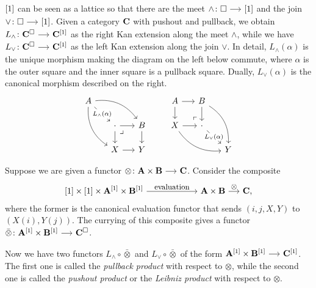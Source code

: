 \documentclass[a4paper,  dvipsnames, 11pt]{amsart}
\begin{document}
\begin{definition}
	\label{defn:LmeetLjoin}
	${\left[1\right]}$ can be seen as a lattice so that there are
	the meet $\land\colon\Box\arr\ra$ and the join $\lor\colon\Box\arr\ra$.
	Given a category $\mathbf{C}$ with pushout and pullback,
	we obtain $L_\land\colon\one{C}^\Box\arr\one{C}^\ra$ as the right Kan extension along the meet $\land$,
	while we have $L_\lor\colon\one{C}^\Box\arr\one{C}^\ra$ as the left Kan extension along the join $\lor$.
	In detail, $L_{\land}(\alpha)$ is the unique morphism making the diagram on the left below commute,
	where $\alpha$ is the outer square and the inner square is a pullback square.
	Dually, $L_{\lor}(\alpha)$ is the canonical morphism described on the right.
	\[
		\begin{tikzcd}[column sep=5mm, row sep=5mm]
			A
			\ar[rdd,bend right]
			\ar[rrd,bend left]
			\ar[rd,"L_\land(\alpha)"description]
				&
					&
			\\
				&
				\cdot
				\ar[r]
				\ar[d]
				\pullback[rd]
					&
					B
					\ar[d]
			\\
				&
				X
				\ar[r]
					&
					Y
		\end{tikzcd}
		\hspace{5ex}
		\begin{tikzcd}[column sep=5mm, row sep=5mm]
			A
			\ar[r]
			\ar[d]
				&
				B
				\ar[d]
				\ar[rdd,bend left]
					&
			\\
			X
			\ar[r]
			\ar[rrd,bend right]
				&
				\cdot
				\ar[rd,"L_\lor(\alpha)"{description,inner sep=.1em}]
				\pullbackR[lu]
					&
			\\
				&
					&
					Y
		\end{tikzcd}
	\]
\end{definition}
\begin{definition}
	Suppose we are given a functor $\otimes\colon\one{A}\times\one{B}\arr\one{C}$.
	Consider the composite
	\[
		\ra\times\ra\times\one{A}^\ra\times\one{B}^\ra
		\arr"\text{evaluation}"[][6]
		\one{A}\times\one{B}
		\arr"\otimes"
		\one{C}\text{,}
	\]
	where the former is the canonical evaluation functor that sends $(i,j,X,Y)$ to $(X(i),Y(j))$.
	The currying of this composite gives a functor $\bar\otimes\colon\one{A}^\ra\times\one{B}^\ra\arr\one{C}^\Box$.

	Now we have two functors $L_\land\circ\bar\otimes$ and $L_\lor\circ\bar\otimes$ of the form $\one{A}^\ra\times\one{B}^\ra\arr\one{C}^\ra$.
	The first one is called the \textit{pullback product} with respect to $\otimes$,
	while the second one is called the \textit{pushout product} or the \textit{Leibniz product} with respect to $\otimes$.
\end{definition}
\end{document}
